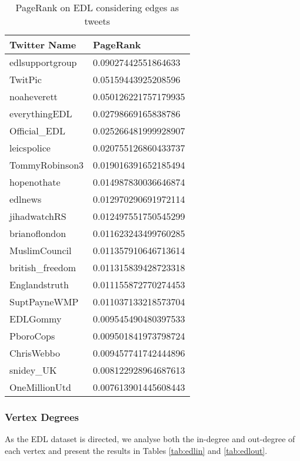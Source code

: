 \begin{table}[htbp]%
\centering
\begin{tabular}{|l|l|}
\hline
Twitter Name & PageRank \\
\hline
edlsupportgroup & 0.09027442551864633 \\
TwitPic & 0.05159443925208596 \\
noaheverett & 0.050126221757179935 \\
everythingEDL & 0.02798669165838786 \\
Official\_EDL & 0.025266481999928907 \\
leicspolice & 0.020755126860433737 \\
TommyRobinson3 & 0.019016391652185494 \\
hopenothate & 0.014987830036646874 \\
edlnews & 0.012970290691972114 \\
jihadwatchRS & 0.012497551750545299 \\
brianoflondon & 0.011623243499760285 \\
MuslimCouncil & 0.011357910646713614 \\
british\_freedom & 0.011315839428723318 \\
Englandstruth & 0.011155872770274453 \\
SuptPayneWMP & 0.011037133218573704 \\
EDLGommy & 0.009545490480397533 \\
PboroCops & 0.009501841973798724 \\
ChrisWebbo & 0.009457741742444896 \\
snidey\_UK & 0.008122928964687613 \\
OneMillionUtd & 0.007613901445608443 \\
\hline
\end{tabular}
\caption{PageRank on EDL considering edges as tweets}
\label{tab:edltweetpagerank}
\end{table}

\subsubsection{Vertex Degrees}
As the EDL dataset is directed, we analyse both the in-degree and out-degree of each vertex and present the results in Tables \ref{tab:edlin} and \ref{tab:edlout}.

